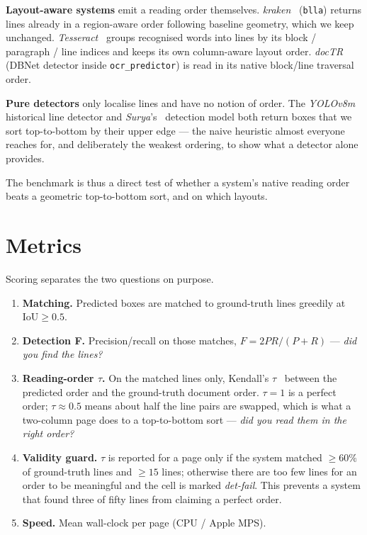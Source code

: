 \documentclass[11pt]{article}
\newcommand{\tw}{\ensuremath{\tau}}
\begin{document}
\textbf{Layout-aware systems} emit a reading order themselves.
\emph{kraken}~\cite{kraken} (\texttt{blla}) returns lines already in a region-aware
order following baseline geometry, which we keep unchanged.
\emph{Tesseract}~\cite{tesseract} groups recognised words into lines by its block
/ paragraph / line indices and keeps its own column-aware layout order.
\emph{docTR}~\cite{doctr} (DBNet detector inside \texttt{ocr\_predictor}) is read
in its native block/line traversal order.

\textbf{Pure detectors} only localise lines and have no notion of order. The
\emph{YOLOv8m}~\cite{yolov8} historical line detector and
\emph{Surya}'s~\cite{surya} detection model both
return boxes that we sort top-to-bottom by their upper edge --- the naive
heuristic almost everyone reaches for, and deliberately the weakest ordering, to
show what a detector alone provides.

The benchmark is thus a direct test of whether a system's native reading order
beats a geometric top-to-bottom sort, and on which layouts.

\section{Metrics}

Scoring separates the two questions on purpose.

\begin{enumerate}[leftmargin=1.4em,itemsep=0.15em]
\item \textbf{Matching.} Predicted boxes are matched to ground-truth lines greedily
at $\text{IoU} \ge 0.5$.
\item \textbf{Detection F.} Precision/recall on those matches, $F = 2PR/(P{+}R)$
--- \emph{did you find the lines?}
\item \textbf{Reading-order \tw{}.} On the matched lines only, Kendall's
\tw{}~\cite{kendall} between the predicted order and the ground-truth document
order. $\tw{}=1$ is a
perfect order; $\tw{}\approx0.5$ means about half the line pairs are swapped, which
is what a two-column page does to a top-to-bottom sort --- \emph{did you read them
in the right order?}
\item \textbf{Validity guard.} \tw{} is reported for a page only if the system
matched $\ge 60\%$ of ground-truth lines and $\ge 15$ lines; otherwise there are
too few lines for an order to be meaningful and the cell is marked
\emph{det-fail}. This prevents a system that found three of fifty lines from
claiming a perfect order.
\item \textbf{Speed.} Mean wall-clock per page (CPU / Apple MPS).
\end{enumerate}
\end{document}
